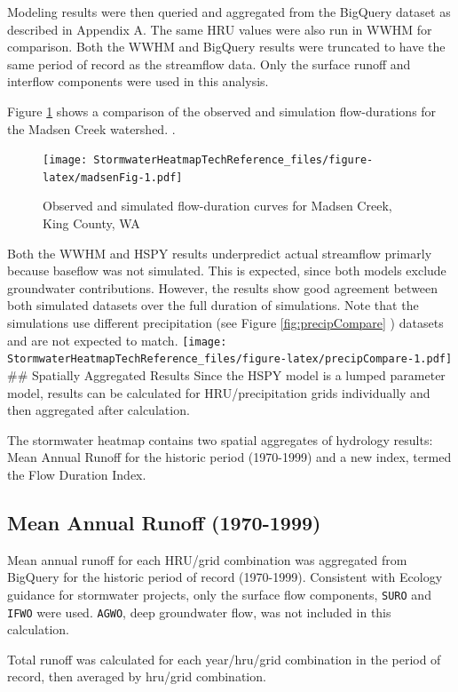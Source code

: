\documentclass[
]{report}
\begin{document}
Modeling results were then queried and aggregated from the BigQuery dataset as described in Appendix A. The same HRU values were also run in WWHM for comparison. Both the WWHM and BigQuery results were truncated to have the same period of record as the streamflow data. Only the surface runoff and interflow components were used in this analysis.

Figure \ref{fig:madsenFig} shows a comparison of the observed and simulation flow-durations for the Madsen Creek watershed. .

\begin{figure}
\centering
\texttt{[image: StormwaterHeatmapTechReference\_files/figure-latex/madsenFig-1.pdf]}
\caption{\label{fig:madsenFig}Observed and simulated flow-duration curves for Madsen Creek, King County, WA}
\end{figure}

Both the WWHM and HSPY results underpredict actual streamflow primarly because baseflow was not simulated. This is expected, since both models exclude groundwater contributions. However, the results show good agreement between both simulated datasets over the full duration of simulations. Note that the simulations use different precipitation (see Figure \ref{fig:precipCompare} ) datasets and are not expected to match.
\texttt{[image: StormwaterHeatmapTechReference\_files/figure-latex/precipCompare-1.pdf]}
\#\# Spatially Aggregated Results
Since the HSPY model is a lumped parameter model, results can be calculated for HRU/precipitation grids individually and then aggregated after calculation.

The stormwater heatmap contains two spatial aggregates of hydrology results: Mean Annual Runoff for the historic period (1970-1999) and a new index, termed the Flow Duration Index.

\hypertarget{mean-annual-runoff-1970-1999}{%
\subsection{Mean Annual Runoff (1970-1999)}\label{mean-annual-runoff-1970-1999}}

Mean annual runoff for each HRU/grid combination was aggregated from BigQuery for the historic period of record (1970-1999). Consistent with Ecology guidance for stormwater projects, only the surface flow components, \texttt{SURO} and \texttt{IFWO} were used. \texttt{AGWO}, deep groundwater flow, was not included in this calculation.

Total runoff was calculated for each year/hru/grid combination in the period of record, then averaged by hru/grid combination.
\end{document}
